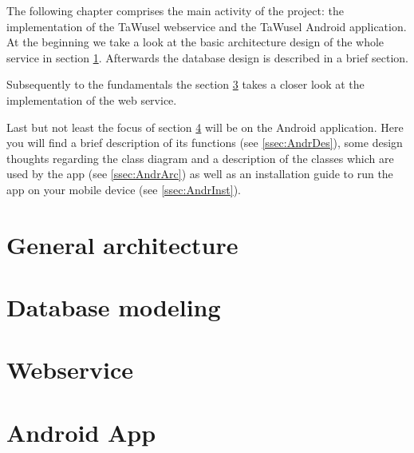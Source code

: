 
The following chapter comprises the main activity of the project: the implementation of the TaWusel webservice and the TaWusel
Android application. At the beginning we take a look at the basic architecture design of the whole service in section
\ref{sec:GArc}. Afterwards the database design is described in a brief section.

\emptyRow
Subsequently to the fundamentals the section \ref{sec:Webs} takes a closer look at the implementation of the web service.

\emptyRow
Last but not least the focus of section \ref{sec:Andr} will be on the Android application. Here you will find a brief description
of its functions (see \ref{ssec:AndrDes}), some design thoughts regarding the class diagram and a description of the classes which
are used by the app (see \ref{ssec:AndrArc}) as well as an installation guide to run the app on your mobile device (see
\ref{ssec:AndrInst}).

\clearpage

\section{General architecture}\label{sec:GArc}


\clearpage
\section{Database modeling}


\clearpage
\section{Webservice}\label{sec:Webs}


\clearpage
\section{Android App}\label{sec:Andr}


